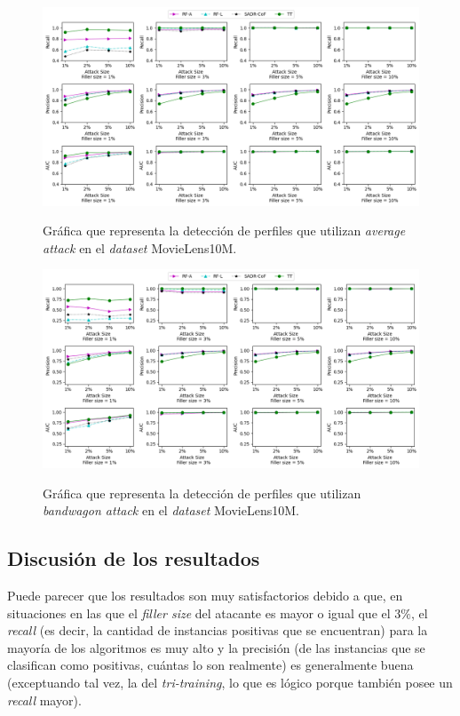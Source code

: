 \begin{figure}[h]
	\caption[\textit{Average attack}: detección.]{Gráfica que representa la detección de perfiles que utilizan \textit{average attack} en el \textit{dataset} MovieLens10M.}
	\centering
	\includegraphics[scale=0.45]{../img/memoria/5_resultados_average_attack}
	\label{5_average_attack}
\end{figure}

\begin{figure}[h]
	\caption[\textit{Bandwagon attack}: detección.]{Gráfica que representa la detección de perfiles que utilizan \textit{bandwagon attack} en el \textit{dataset} MovieLens10M.}
	\centering
	\includegraphics[scale=0.45]{../img/memoria/5_resultados_bandwagon_attack}
	\label{5_bandwagon_attack}
\end{figure}

\subsection{Discusión de los resultados}

Puede parecer que los resultados son muy satisfactorios debido a que, en situaciones en las que el \textit{filler size} del atacante es mayor o igual que el $3\%$, el \textit{recall} (es decir, la cantidad de instancias positivas que se encuentran) para la mayoría de los algoritmos es muy alto y la precisión (de las instancias que se clasifican como positivas, cuántas lo son realmente) es generalmente buena (exceptuando tal vez, la del \textit{tri-training}, lo que es lógico porque también posee un \textit{recall} mayor).


